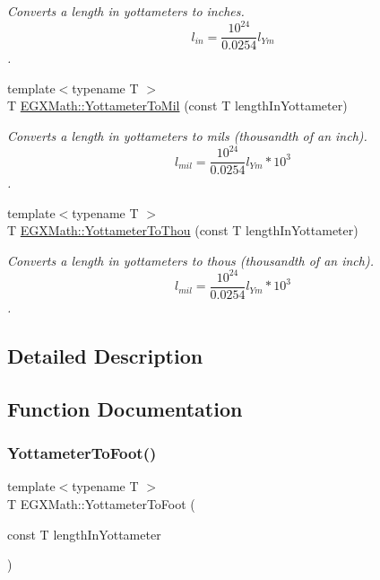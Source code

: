 \begin{DoxyCompactItemize}
\begin{DoxyCompactList}\small\item\em Converts a length in yottameters to inches. \[ l_{in}= \frac{10^{24}}{0.0254} l_{Ym} \]. \end{DoxyCompactList}\item 
{\footnotesize template$<$typename T $>$ }\\T \mbox{\hyperlink{group___e_g_x_math-_conversions-_length_conversions-_s_i-_yottameter-_imperial_ga71ee7b2256fffaec2663bd2eafc30a9d}{E\+G\+X\+Math\+::\+Yottameter\+To\+Mil}} (const T length\+In\+Yottameter)
\begin{DoxyCompactList}\small\item\em Converts a length in yottameters to mils (thousandth of an inch). \[ l_{mil}= \frac{10^{24}}{0.0254} l_{Ym} * 10^{3} \]. \end{DoxyCompactList}\item 
{\footnotesize template$<$typename T $>$ }\\T \mbox{\hyperlink{group___e_g_x_math-_conversions-_length_conversions-_s_i-_yottameter-_imperial_ga9bf8eeca799b8246932d4aeaac425d87}{E\+G\+X\+Math\+::\+Yottameter\+To\+Thou}} (const T length\+In\+Yottameter)
\begin{DoxyCompactList}\small\item\em Converts a length in yottameters to thous (thousandth of an inch). \[ l_{mil}= \frac{10^{24}}{0.0254} l_{Ym} * 10^{3} \]. \end{DoxyCompactList}\end{DoxyCompactItemize}


\subsection{Detailed Description}


\subsection{Function Documentation}
\mbox{\label{group___e_g_x_math-_conversions-_length_conversions-_s_i-_yottameter-_imperial_gae693078fe8f9b2ca717732916dcf28d7}} 
\subsubsection{\texorpdfstring{Yottameter\+To\+Foot()}{YottameterToFoot()}}
{\footnotesize\ttfamily template$<$typename T $>$ \\
T E\+G\+X\+Math\+::\+Yottameter\+To\+Foot (\begin{DoxyParamCaption}\item[{const T}]{length\+In\+Yottameter }\end{DoxyParamCaption})}




